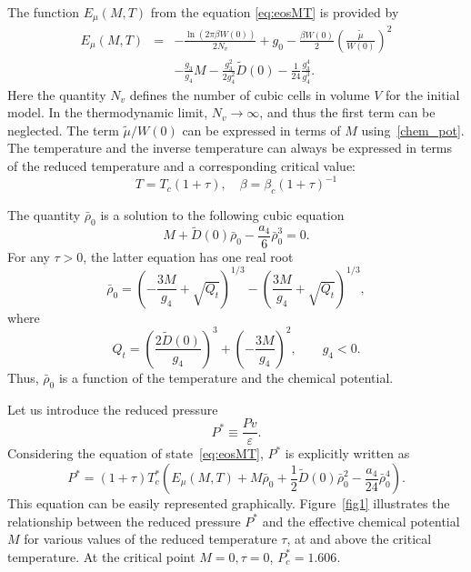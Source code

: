 \documentclass[12pt]{article}
\begin{document}
	The function $E_\mu(M, T)$ from the equation \eqref{eq:eosMT} is provided by
	\begin{eqnarray}\label{eq:E_mu}
		E_\mu (M, T) & = & - \frac{\ln (2\pi \beta W(0))}{2 N_v}  +  g_0 - \frac{\beta W(0)}{2} 
		\left(\frac{\tilde\mu}{W(0)} \right)^{2} 
		\nonumber\\
		&& - \frac{g_3}{g_4} {M} \! - \frac{g_3^2}{2 g_4^2}  \tilde D(0) - \frac{1}{24} \frac{g_3^4}{g_4^3}. 
	\end{eqnarray}
	Here the quantity $N_v$ defines the number of cubic cells in volume $V$ for the initial model.
	In the thermodynamic limit, $N_v \to \infty$, and thus the first term can be neglected. The term $\tilde{\mu}/W(0)$ can be expressed in terms of $M$ using~\eqref{chem_pot}. The temperature and the inverse temperature can always be expressed in terms of the reduced temperature and a corresponding critical value:
	\begin{equation*}
		T = T_c(1+\tau), \quad \beta = \beta_c (1 + \tau)^{-1}
	\end{equation*} 
	
	The quantity $\bar{\rho}_0$ is a solution to the following cubic equation
	\begin{equation}\label{eq:ro_M}
	M + \tilde D(0) \bar\rho_0 - \frac{a_4}{6} \bar\rho_0^3 = 0.
	\end{equation}
	For any $\tau > 0$, the latter equation has one real root
	\begin{equation}\label{eq:ro_MT}
	\bar \rho_0 = \left(- \frac{3 M}{g_4} + \sqrt{Q_t}\right)^{1/3} - \left(  \frac{3 M}{g_4} + \sqrt{Q_t} \right)^{1/3},
	\end{equation}
	where
	\begin{equation}
	Q_t = \left(  \frac{2\tilde D(0)}{g_4}\right)^3 + \left( -\frac{3 M}{g_4}\right)^2, \qquad g_4<0.
	\end{equation}
	Thus, $\bar{\rho}_0$ is a function of the temperature and the chemical potential.
	
	Let us introduce the reduced pressure
	\begin{equation}
		\label{def:reduced_pres}
		P^* \equiv \frac{P v}{\varepsilon}.
	\end{equation}
	Considering the equation of state~\eqref{eq:eosMT}, $P^*$ is explicitly written as
	\begin{equation}
		\label{eq:eosPTM_reduced}
		P^* = (1 + \tau)T^*_c \left( E_\mu(M, T) + M \bar \rho_0 + \frac{1}{2} \tilde D(0) \bar \rho_0^2 - \frac{a_4}{24} \bar \rho_0^4 \right).
	\end{equation}
	This equation can be easily represented graphically. Figure~\ref{fig1} illustrates the relationship between the reduced pressure $P^*$ and the effective chemical potential $M$ for various values of the reduced temperature $\tau$, at and above the critical temperature. At the critical point $M=0, \tau=0$, $P^*_c = 1.606$. 
	
\end{document}
